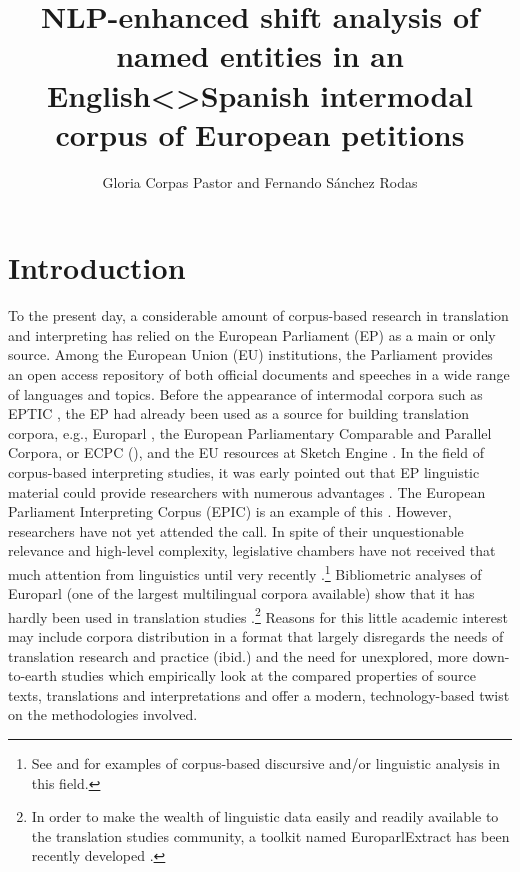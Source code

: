 \documentclass[output=paper]{langscibook}
\author{Gloria Corpas Pastor\orcid{}\affiliation{University of Malaga} and Fernando Sánchez Rodas\orcid{}\affiliation{University of Malaga}}
\title[NLP-enhanced shift analysis of named entities]{NLP-enhanced shift analysis of named entities in an English<>Spanish intermodal corpus of European petitions}
\begin{document}
\maketitle






\section{Introduction}\label{sec:corpas:1}

To the present day, a considerable amount of corpus-based research in translation and interpreting has relied on the European Parliament (EP) as a main or only source. Among the European Union (EU) institutions, the Parliament provides an open access repository of both official documents and speeches in a wide range of languages and topics. Before the appearance of intermodal corpora such as EPTIC \citep{BernardiniEtAl2016}, the EP had already been used as a source for building translation corpora, e.g., Europarl  \citep{Koehn2005}, the European Parliamentary Comparable and Parallel Corpora, or ECPC (\citealt{MartinezSerrat2012}), and the EU resources at Sketch Engine \citep{BaisaEtAl2016}. In the field of corpus-based interpreting studies, it was early pointed out that EP linguistic material could provide researchers with numerous advantages \citep{Bendazzoli2010}. The European Parliament Interpreting Corpus (EPIC) is an example of this \citep{RussoEtAl2012}. However, researchers have not yet attended the call. In spite of their unquestionable relevance and high-level complexity, legislative chambers have not received that much attention from linguistics until very recently \citep{calzada-perez_researching_2017}.\footnote{See \citet{Veroz2014a, Veroz2014b, Veroz2017} and \citet{PrietoRamos2019} for examples of corpus-based discursive and/or linguistic analysis in this field.} Bibliometric analyses of Europarl (one of the largest multilingual corpora available) show that it has hardly been used in translation studies \citep{Ustaszewski2019}.\footnote{In order to make the wealth of linguistic data easily and readily available to the translation studies community, a toolkit named EuroparlExtract has been recently developed \citep{Ustaszewski2019}.} Reasons for this little academic interest may include corpora distribution in a format that largely disregards the needs of translation research and practice (ibid.) and the need for unexplored, more down-to-earth studies which empirically look at the compared properties of source texts, translations and interpretations and offer a modern, technology-based twist on the methodologies involved.
\end{document}
